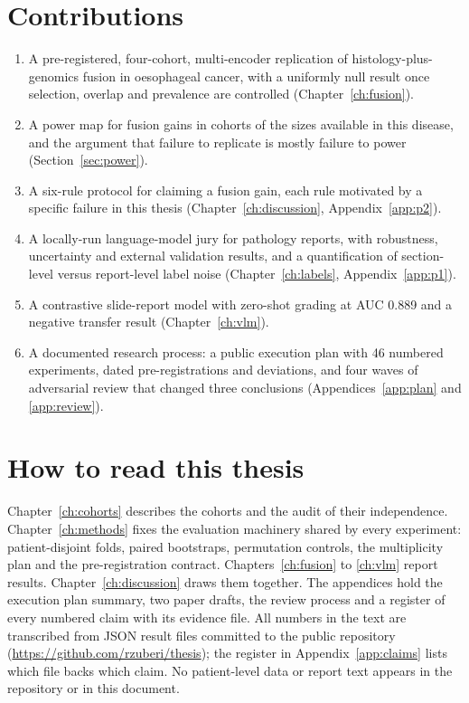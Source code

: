 \section{Contributions}

\begin{enumerate}
\item A pre-registered, four-cohort, multi-encoder replication of histology-plus-genomics fusion in oesophageal cancer, with a uniformly null result once selection, overlap and prevalence are controlled (Chapter~\ref{ch:fusion}).
\item A power map for fusion gains in cohorts of the sizes available in this disease, and the argument that failure to replicate is mostly failure to power (Section~\ref{sec:power}).
\item A six-rule protocol for claiming a fusion gain, each rule motivated by a specific failure in this thesis (Chapter~\ref{ch:discussion}, Appendix~\ref{app:p2}).
\item A locally-run language-model jury for pathology reports, with robustness, uncertainty and external validation results, and a quantification of section-level versus report-level label noise (Chapter~\ref{ch:labels}, Appendix~\ref{app:p1}).
\item A contrastive slide-report model with zero-shot grading at AUC 0.889 and a negative transfer result (Chapter~\ref{ch:vlm}).
\item A documented research process: a public execution plan with 46 numbered experiments, dated pre-registrations and deviations, and four waves of adversarial review that changed three conclusions (Appendices~\ref{app:plan} and \ref{app:review}).
\end{enumerate}

\section{How to read this thesis}

Chapter~\ref{ch:cohorts} describes the cohorts and the audit of their independence. Chapter~\ref{ch:methods} fixes the evaluation machinery shared by every experiment: patient-disjoint folds, paired bootstraps, permutation controls, the multiplicity plan and the pre-registration contract. Chapters~\ref{ch:fusion} to \ref{ch:vlm} report results. Chapter~\ref{ch:discussion} draws them together. The appendices hold the execution plan summary, two paper drafts, the review process and a register of every numbered claim with its evidence file. All numbers in the text are transcribed from JSON result files committed to the public repository (\url{https://github.com/rzuberi/thesis}); the register in Appendix~\ref{app:claims} lists which file backs which claim. No patient-level data or report text appears in the repository or in this document.
